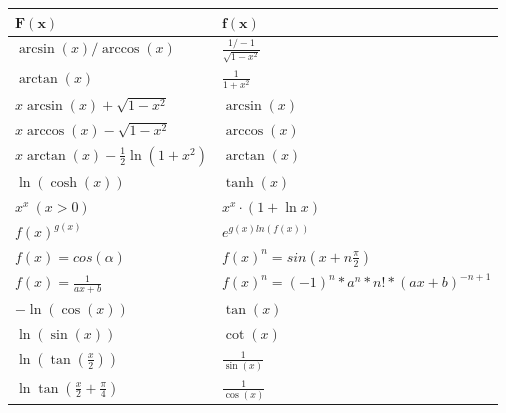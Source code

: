 \begin{center}
  \begin{tabularx}{\linewidth}{>{\centering\arraybackslash}X>{\centering\arraybackslash}X}

    $\mathbf{F(x)}$                          & $\mathbf{f(x)}$                                \\
    \midrule
    $\arcsin(x) / \arccos(x)$                & $\frac{1 / -1}{\sqrt{1 - x^2}}$                \\
    $\arctan(x)$                             & $\frac{1}{1 + x^2}$                            \\

    $x\arcsin(x) + \sqrt{1 - x^2}$           & $\arcsin(x)$                                   \\
    $x\arccos(x) - \sqrt{1 - x^2}$           & $\arccos(x)$                                   \\
    $x\arctan(x) - \frac{1}{2}\ln(1+x^2)$    & $\arctan(x)$                                   \\
    $\ln(\cosh(x))$                          & $\tanh(x)$                                     \\

    $x^x \ (x > 0)$                          & $x^x \cdot (1 + \ln{x})$                       \\
    $f(x)^{g(x)}$                            & $e^{g(x) ln(f(x))}$                            \\
    $f(x) = cos(\alpha)$                     & $f(x)^n = sin(x + n\frac{\pi}{2})$             \\
    $f(x) = \frac{1}{ax + b}$                & $f(x)^n = (-1)^n * a^n * n! * (ax + b)^{-n+1}$ \\
    $-\ln(\cos(x))$                          & $\tan(x)$                                      \\
    $\ln(\sin(x))$                           & $\cot(x)$                                      \\
    $\ln(\tan(\frac{x}{2}))$                 & $\frac{1}{\sin(x)}$                            \\
    $\ln{\tan(\frac{x}{2} + \frac{\pi}{4})}$ & $\frac{1}{\cos(x)}$                            \\

    \bottomrule
  \end{tabularx}
\end{center}

